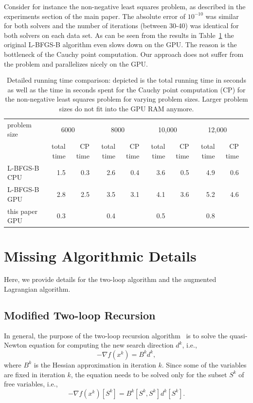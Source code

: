 \documentclass[letterpaper]{article} %
\begin{document}
Consider for instance the non-negative least squares problem, as described in the experiments section of the main paper. The absolute error of $10^{-10}$ was similar for both solvers and the number of iterations (between 30-40) was identical for both solvers on each data set. As can be seen from the results in Table~\ref{tab:nnls_0} the original L-BFGS-B algorithm even slows down on the GPU. The reason is the bottleneck of the Cauchy point computation. Our approach does not suffer from the problem and parallelizes nicely on the GPU.


\begin{table}[h!]
\begin{center}
  \small
  \begin{tabular}{l*{9}{r}}
    \toprule
   problem size  & \multicolumn{2}{c}{6000} & \multicolumn{2}{c}{8000} & \multicolumn{2}{c}{10,000} & \multicolumn{2}{c}{12,000} \\
    & total time & CP  time & total time & CP time & total time & CP time & total time & CP time\\
    \midrule
    L-BFGS-B CPU & 1.5 & 0.3 & 2.6 & 0.4 & 3.6 & 0.5 & 4.9 & 0.6\\
    L-BFGS-B GPU & 2.8 & 2.5 & 3.5 & 3.1 & 4.1 & 3.6 & 5.2 & 4.6\\
    this paper GPU & 0.3 &     & 0.4 &      & 0.5 &      & 0.8 &\\
    \bottomrule
  \end{tabular}%
  \caption{Detailed running time comparison: depicted is the total running time in seconds as well as the time in seconds spent for the Cauchy point computation (CP) for the non-negative least squares problem for varying problem sizes. Larger problem sizes do not fit into the GPU RAM anymore.}
  \label{tab:nnls_0}
  \end{center}
\end{table}


\newpage
\section{Missing Algorithmic Details}
Here, we provide details for the two-loop algorithm and the augmented Lagrangian algorithm. 

\subsection{Modified Two-loop Recursion}
In general, the purpose of the two-loop recursion algorithm~\cite{NocedalW99} is to solve the quasi-Newton equation for computing the new search direction $d^k$, i.e.,
\[
   -\nabla f(x^k)=B^k d^k,
\]
where $B^k$ is the Hessian approximation in iteration $k$. Since some of the variables are fixed in iteration $k$, the equation needs to be solved only for the subset $S^k$ of 
free variables, i.e.,
\[
   -\nabla f(x^k)[S^k]=B^k[S^k, S^k] d^k[S^k].
\]
\end{document}
